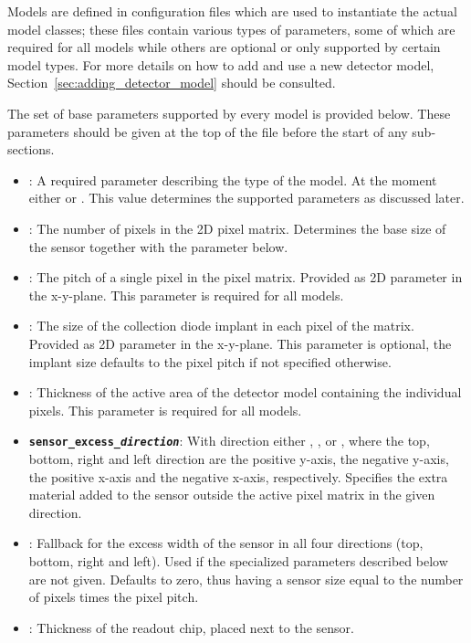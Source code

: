 Models are defined in configuration files which are used to instantiate the actual model classes; these files contain various types of parameters, some of which are required for all models while others are optional or only supported by certain model types.
For more details on how to add and use a new detector model, Section~\ref{sec:adding_detector_model} should be consulted.

The set of base parameters supported by every model is provided below.
These parameters should be given at the top of the file before the start of any sub-sections.
\begin{itemize}
\item {}: A required parameter describing the type of the model.
At the moment either  or .
This value determines the supported parameters as discussed later.
\item {}: The number of pixels in the 2D pixel matrix.
Determines the base size of the sensor together with the  parameter below.
\item {}: The pitch of a single pixel in the pixel matrix.
Provided as 2D parameter in the x-y-plane.
This parameter is required for all models.
\item {}: The size of the collection diode implant in each pixel of the matrix.
Provided as 2D parameter in the x-y-plane.
This parameter is optional, the implant size defaults to the pixel pitch if not specified otherwise.
\item {}: Thickness of the active area of the detector model containing the individual pixels.
This parameter is required for all models.
\item \texttt{\textbf{sensor\_excess\_\textit{direction}}}: With direction either , ,  or , where the top, bottom, right and left direction are the positive y-axis, the negative y-axis, the positive x-axis and the negative x-axis, respectively.
Specifies the extra material added to the sensor outside the active pixel matrix in the given direction.
\item {}: Fallback for the excess width of the sensor in all four directions (top, bottom, right and left).
Used if the specialized parameters described below are not given.
Defaults to zero, thus having a sensor size equal to the number of pixels times the pixel pitch.
\item {}: Thickness of the readout chip, placed next to the sensor.
\end{itemize}


